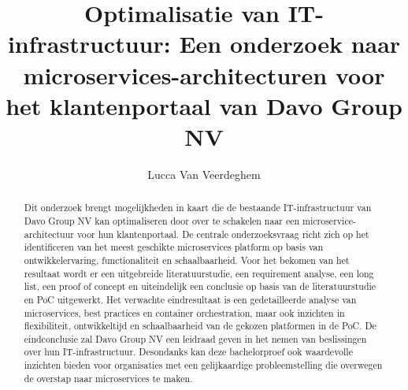 \documentclass{hogent-article}
\title{Optimalisatie van IT-infrastructuur: Een onderzoek naar microservices-architecturen voor het klantenportaal van Davo Group NV}
\author{Lucca Van Veerdeghem}
\begin{document}
\begin{abstract}
Dit onderzoek brengt mogelijkheden in kaart die de bestaande IT-infrastructuur van Davo Group NV kan optimaliseren door over te schakelen naar een microservice-architectuur voor hun klantenportaal. De centrale onderzoeksvraag richt zich op het identificeren van het meest geschikte microservices platform op basis van ontwikkelervaring, functionaliteit en schaalbaarheid. Voor het bekomen van het resultaat wordt er een uitgebreide literatuurstudie, een requirement analyse, een long list, een proof of concept en uiteindelijk een conclusie op basis van de literatuurstudie en PoC uitgewerkt. Het verwachte eindresultaat is een gedetailleerde analyse van microservices, best practices en container orchestration, maar ook inzichten in flexibiliteit, ontwikkeltijd en schaalbaarheid van de gekozen platformen in de PoC. De eindconclusie zal Davo Group NV een leidraad geven in het nemen van beslissingen over hun IT-infrastructuur. Desondanks kan deze bachelorproef ook waardevolle inzichten bieden voor organisaties met een gelijkaardige probleemstelling die overwegen de overstap naar microservices te maken.
    
\end{abstract}

\tableofcontents



\printbibliography[heading=bibintoc]
\end{document}
